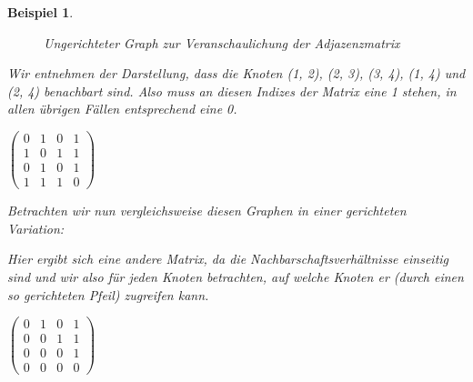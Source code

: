 \documentclass[11pt,a4paper]{scrartcl}
\newtheorem{example}{Beispiel}
\begin{document}
\begin{example}
\begin{figure}[h]
\centering
{}
\caption{Ungerichteter Graph zur Veranschaulichung der Adjazenzmatrix}
\end{figure}
Wir entnehmen der Darstellung, dass die Knoten (1, 2), (2, 3), (3, 4), (1, 4) und (2, 4) benachbart sind. Also muss an diesen Indizes der Matrix eine 1 stehen, in allen übrigen Fällen entsprechend eine 0. \\
\begin{center}
$\left( \begin{array}{rrrr}
0&1&0&1 \\
1&0&1&1 \\
0&1&0&1 \\
1&1&1&0
\end{array} \right)$
\end{center}
Betrachten wir nun vergleichsweise diesen Graphen in einer gerichteten Variation: \\
\begin{figure}[h]
\centering
{}
\end{figure}
Hier ergibt sich eine andere Matrix, da die Nachbarschaftsverhältnisse einseitig sind und wir also für jeden Knoten betrachten, auf welche Knoten er (durch einen so gerichteten Pfeil) {\glqq}zugreifen{\grqq} kann. \\
\begin{center}
$\left( \begin{array}{rrrr}
0&1&0&1 \\
0&0&1&1 \\
0&0&0&1 \\
0&0&0&0
\end{array} \right)$
\end{center}
\end{example}
\end{document}
